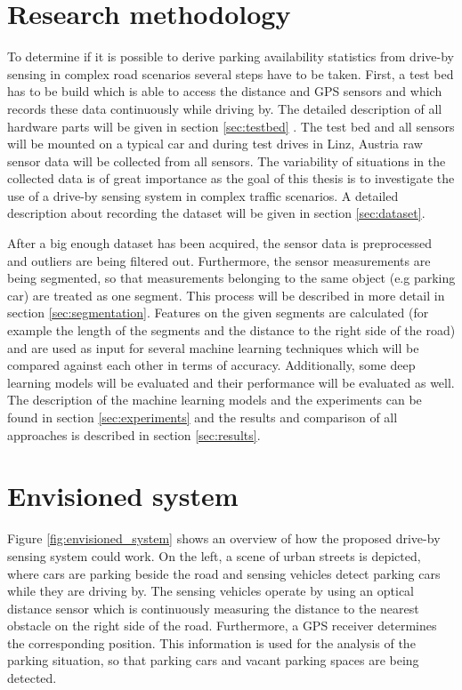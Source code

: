 \section{Research methodology}
To determine if it is possible to derive parking availability statistics from drive-by sensing in complex road scenarios several steps have to be taken. First, a test bed has to be build which is able to access the distance and GPS sensors and which records these data continuously while driving by. The detailed description of all hardware parts will be given in section \ref{sec:testbed} . The test bed and all sensors will be mounted on a typical car and during test drives in Linz, Austria raw sensor data will be collected from all sensors. The variability of situations in the collected data is of great importance as the goal of this thesis is to investigate the use of a drive-by sensing system in complex traffic scenarios. A detailed description about recording the dataset will be given in
section  \ref{sec:dataset}.

After a big enough dataset has been acquired, the sensor data is preprocessed and outliers are being filtered out. Furthermore, the sensor measurements are being segmented, so that measurements belonging to the same object (e.g parking car) are treated as one segment. This process will be described in more detail in section  \ref{sec:segmentation}. Features on the given segments are calculated (for example the length of the segments and the distance to the right side of the road) and are used as input for several machine learning techniques which will be compared against each other in terms of accuracy. Additionally, some deep learning models will be evaluated and their performance will be evaluated as well. The description of the machine learning  models and the experiments can be found in section  \ref{sec:experiments} and the results and comparison of all approaches is described in section  \ref{sec:results}. 


\section{Envisioned system}

Figure \ref{fig:envisioned_system} shows an overview of how the proposed drive-by sensing system could work. On the left, a scene of urban streets is depicted, where cars are parking beside the road and sensing vehicles detect parking cars while they are driving by. The sensing vehicles operate by using an optical distance sensor which is continuously measuring the distance to the nearest obstacle on the right side of the road. Furthermore, a GPS receiver determines the corresponding position. This information is used for the analysis of the parking situation, so that parking cars and vacant parking spaces are being detected.


